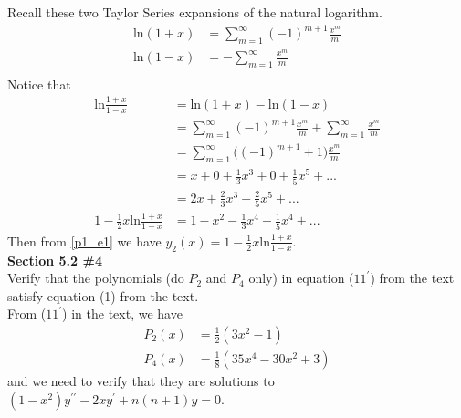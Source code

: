 \documentclass[12pt]{article}
\newcommand{\problem}[1]{\hspace{-4 ex} \large \textbf{#1}\\}
\begin{document}
	Recall these two Taylor Series expansions of the natural logarithm. \\
	\begin{align*}
		\text{ln}(1+x) & = \sum\limits_{m=1}^\infty (-1)^{m+1} \frac{x^m}{m}\\
		\text{ln}(1-x) & = -\sum\limits_{m=1}^\infty \frac{x^m}{m}\\
	\end{align*}
	Notice that
	\begin{align*}
		\text{ln}\frac{1+x}{1-x} & = \text{ln}(1+x) - \text{ln}(1-x) \\
		& = \sum\limits_{m=1}^\infty (-1)^{m+1} \frac{x^m}{m} + \sum\limits_{m=1}^\infty \frac{x^m}{m} \\
		& = \sum\limits_{m=1}^\infty \big( (-1)^{m+1} + 1 \big) \frac{x^m}{m} \\
		& = x + 0 + \frac{1}{3}x^3 + 0 + \frac{1}{5}x^5 + ... \\
		& = 2x + \frac{2}{3}x^3 + \frac{2}{5}x^5 + ... \\
		1 - \frac{1}{2}x\text{ln}\frac{1+x}{1-x}& = 1 -x^2 - \frac{1}{3}x^4 - \frac{1}{5}x^4 + ...
	\end{align*}
	Then from \ref{p1_e1} we have $y_2(x) = 1 - \frac{1}{2}x\text{ln}\frac{1+x}{1-x}$. \\
	
\problem{Section 5.2 \#4} Verify that the polynomials (do $P_2$ and $P_4$ only) in equation ($11^\prime$) from the text satisfy equation (1) from the text. \\

	From ($11^\prime$) in the text, we have
	\begin{align*}
		P_2(x) & = \frac{1}{2}(3x^2-1) \\
		P_4(x) & = \frac{1}{8}(35x^4-30x^2+3) 
	\end{align*}
	and we need to verify that they are solutions to $(1-x^2)y^{\prime\prime} - 2xy^\prime + n(n+1)y=0$. 
	
\end{document}
